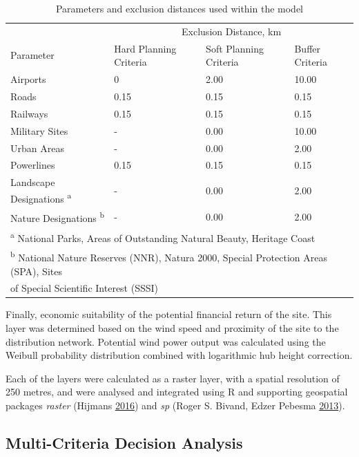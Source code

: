 \documentclass[a4paper,]{article}
\theoremstyle{definition}
\theoremstyle{definition}
\theoremstyle{remark}
\begin{document}
{\begin{table}
\caption{\label{tab:unnamed-chunk-1}Parameters and exclusion distances used within the model}
\centering
\begin{tabular}[t]{llll}
\toprule
\multicolumn{1}{c}{ } & \multicolumn{3}{c}{Exclusion Distance, km} \\ \cmidrule(l{2pt}r{2pt}){2-4}
Parameter & Hard Planning Criteria & Soft Planning Criteria & Buffer Criteria\\
\midrule
Airports & 0 & 2.00 & 10.00\\
Roads & 0.15 & 0.15 & 0.15\\
Railways & 0.15 & 0.15 & 0.15\\
Military Sites & - & 0.00 & 10.00\\
Urban Areas & - & 0.00 & 2.00\\
\addlinespace
Powerlines & 0.15 & 0.15 & 0.15\\
Landscape Designations \textsuperscript{a} & - & 0.00 & 2.00\\
Nature Designations \textsuperscript{b} & - & 0.00 & 2.00\\
\bottomrule
\multicolumn{4}{l}{\textsuperscript{a} National Parks, Areas of Outstanding Natural Beauty, Heritage Coast}\\
\multicolumn{4}{l}{\textsuperscript{b} National Nature Reserves (NNR), Natura 2000, Special Protection Areas (SPA), Sites}\\
\multicolumn{4}{l}{of Special Scientific Interest (SSSI)}\\
\end{tabular}
\end{table}

Finally, economic suitability of the potential financial return of the
site. This layer was determined based on the wind speed and proximity of
the site to the distribution network. Potential wind power output was
calculated using the Weibull probability distribution combined with
logarithmic hub height correction.

Each of the layers were calculated as a raster layer, with a spatial
resolution of 250 metres, and were analysed and integrated using R and
supporting geospatial packages \emph{raster} (Hijmans
\protect\hyperlink{ref-raster}{2016}) and \emph{sp} (Roger S. Bivand,
Edzer Pebesma
\protect\hyperlink{ref-RogerS.BivandEdzerPebesma2013}{2013}).

\subsection{Multi-Criteria Decision
Analysis}\label{multi-criteria-decision-analysis}

}
\end{document}

